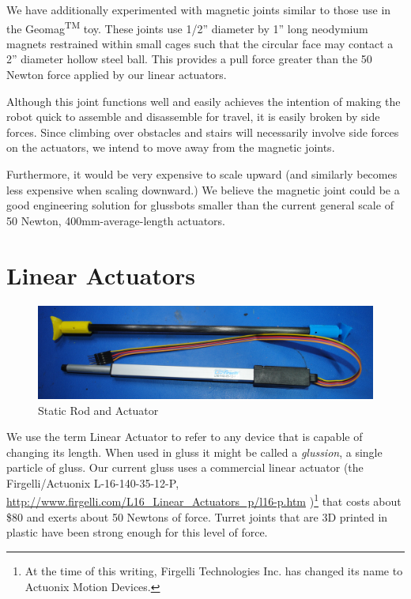 \documentclass[11pt]{article}
\begin{document}
We have additionally experimented with magnetic joints similar to those use in the Geomag\textsuperscript{TM} toy.
These joints use 1/2'' diameter by 1'' long neodymium magnets restrained within small cages such that the circular face
may contact a 2'' diameter hollow steel ball.  This provides a pull force greater than the 50 Newton force applied by our linear
actuators.

Although this joint functions well and easily achieves the intention of making the robot quick to assemble and disassemble for travel,
it is easily broken by side forces. Since climbing over obstacles and stairs will necessarily involve side forces on the actuators,
we intend to move away from the magnetic joints.

Furthermore, it would be very expensive to scale upward (and similarly becomes less expensive when
scaling downward.) We believe the magnetic joint could be a good engineering solution for glussbots smaller than the current
general scale of 50 Newton, 400mm-average-length actuators.


\section{Linear Actuators}
\label{linearactuators}

\begin{figure}[H]
  \centering
    \includegraphics[width=1.0\textwidth]{figures/CarbonFiberAndActuator.jpg}
    \caption[Static Rod and Actuator]{Static Rod and Actuator}
      \label{rodAndActuator}
\end{figure}

We use the term Linear Actuator to refer to any device that is capable of changing its length. When
used in gluss it might be called a \emph{glussion}, a single particle of gluss. Our current gluss
uses a commercial linear actuator (the Firgelli/Actuonix L-16-140-35-12-P,
\href{http://www.firgelli.com/L16_Linear_Actuators_p/l16-p.htm}{http://www.firgelli.com/L16\_Linear\_Actuators\_p/l16-p.htm}
)\footnote{At the time of this writing, Firgelli Technologies Inc. has changed its name to Actuonix Motion Devices.}
that costs about \$80 and exerts about 50 Newtons of force.
Turret joints that are 3D printed in plastic have been strong enough for this level of force.
\end{document}
